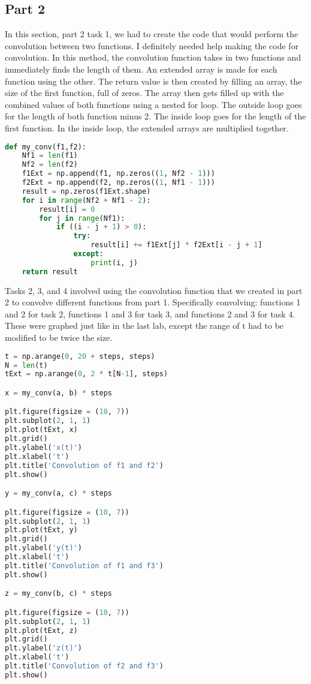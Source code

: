 \documentclass[12pt]{report}
\begin{document}
\subsection{Part 2}
In this section, part 2 task 1, we had to create the code that would 
perform the convolution between two functions. I definitely needed help
making the code for convolution. In this method, the convolution
function takes in two functions and immediately finds the length of them.
An extended array is made for each function using the other. The return value is then created by filling an array, the size of the first function,
full of zeros. The array then gets filled up with the combined values of
both functions using a nested for loop. The outside loop goes for the
length of both function minus 2. The inside loop goes for the length
of the first function. In the inside loop, the extended arrays are
multiplied together.
\begin{lstlisting}[language=Python]
def my_conv(f1,f2):
    Nf1 = len(f1)
    Nf2 = len(f2)
    f1Ext = np.append(f1, np.zeros((1, Nf2 - 1)))
    f2Ext = np.append(f2, np.zeros((1, Nf1 - 1)))
    result = np.zeros(f1Ext.shape)
    for i in range(Nf2 + Nf1 - 2):
        result[i] = 0
        for j in range(Nf1):
            if ((i - j + 1) > 0):
                try: 
                    result[i] += f1Ext[j] * f2Ext[i - j + 1]
                except:
                    print(i, j)
    return result
\end{lstlisting}
Tasks 2, 3, and 4 involved using the convolution function that we created in part 
2 to convolve different functions from part 1. Specifically convolving: functions
1 and 2 for task 2, functions 1 and 3 for task 3, and functions 
2 and 3 for task 4. These were graphed just like in the last lab,
except the range of t had to be modified to be twice the size.

\begin{lstlisting}[language=Python]
t = np.arange(0, 20 + steps, steps)
N = len(t)
tExt = np.arange(0, 2 * t[N-1], steps)

x = my_conv(a, b) * steps

plt.figure(figsize = (10, 7))
plt.subplot(2, 1, 1)
plt.plot(tExt, x)
plt.grid()
plt.ylabel('x(t)')
plt.xlabel('t')
plt.title('Convolution of f1 and f2')
plt.show()

y = my_conv(a, c) * steps

plt.figure(figsize = (10, 7))
plt.subplot(2, 1, 1)
plt.plot(tExt, y)
plt.grid()
plt.ylabel('y(t)')
plt.xlabel('t')
plt.title('Convolution of f1 and f3')
plt.show()

z = my_conv(b, c) * steps

plt.figure(figsize = (10, 7))
plt.subplot(2, 1, 1)
plt.plot(tExt, z)
plt.grid()
plt.ylabel('z(t)')
plt.xlabel('t')
plt.title('Convolution of f2 and f3')
plt.show()
\end{lstlisting}
\newpage
\end{document}
